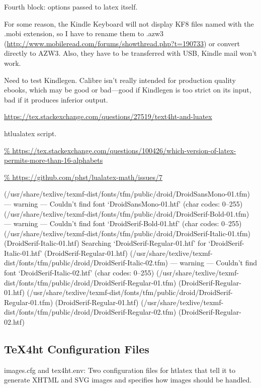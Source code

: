 \documentclass[12pt]{article}
\begin{document}
Fourth block: options passed to latex itself.

For some reason, the Kindle Keyboard will not display KF8 files named
with the .mobi extension, so I have to rename them to .azw3
(\url{http://www.mobileread.com/forums/showthread.php?t=190733}) or
convert directly to AZW3.  Also, they have to be transferred with USB,
Kindle mail won't work.

Need to test Kindlegen.  Calibre isn't really intended for production
quality ebooks, which may be good or bad---good if Kindlegen is too
strict on its input, bad if it produces inferior output.

\url{
https://tex.stackexchange.com/questions/27519/text4ht-and-luatex
}

htlualatex script.


\url{%
https://tex.stackexchange.com/questions/100426/which-version-of-latex-permits-more-than-16-alphabets
}

\url{%
https://github.com/phst/lualatex-math/issues/7
}

(/usr/share/texlive/texmf-dist/fonts/tfm/public/droid/DroidSansMono-01.tfm)
--- warning --- Couldn't find font `DroidSansMono-01.htf' (char codes: 0--255)
(/usr/share/texlive/texmf-dist/fonts/tfm/public/droid/DroidSerif-Bold-01.tfm)
--- warning --- Couldn't find font `DroidSerif-Bold-01.htf' (char codes: 0--255)
(/usr/share/texlive/texmf-dist/fonts/tfm/public/droid/DroidSerif-Italic-01.tfm)
(DroidSerif-Italic-01.htf)
Searching `DroidSerif-Regular-01.htf' for `DroidSerif-Italic-01.htf'
(DroidSerif-Regular-01.htf)
(/usr/share/texlive/texmf-dist/fonts/tfm/public/droid/DroidSerif-Italic-02.tfm)
--- warning --- Couldn't find font `DroidSerif-Italic-02.htf' (char codes: 0--255)
(/usr/share/texlive/texmf-dist/fonts/tfm/public/droid/DroidSerif-Regular-01.tfm)
(DroidSerif-Regular-01.htf)
(/usr/share/texlive/texmf-dist/fonts/tfm/public/droid/DroidSerif-Regular-01.tfm)
(DroidSerif-Regular-01.htf)
(/usr/share/texlive/texmf-dist/fonts/tfm/public/droid/DroidSerif-Regular-02.tfm)
(DroidSerif-Regular-02.htf)


\subsection{TeX4ht Configuration Files}
\label{sec:tex4ht_configuration_files}

images.cfg and tex4ht.env: Two configuration files for htlatex that
tell it to generate XHTML and SVG images and specifies how images
should be handled.
\end{document}
